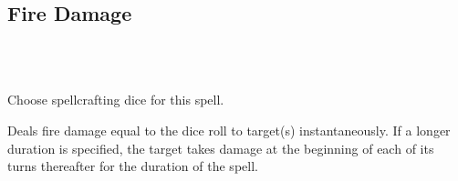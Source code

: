 \subsection*{Fire Damage}
 \\
\\

Choose spellcrafting dice for this spell.

Deals fire damage equal to the dice roll to target(s) instantaneously. If a longer
duration is specified, the target takes damage at the beginning of each of its
turns thereafter for the duration of the spell.
